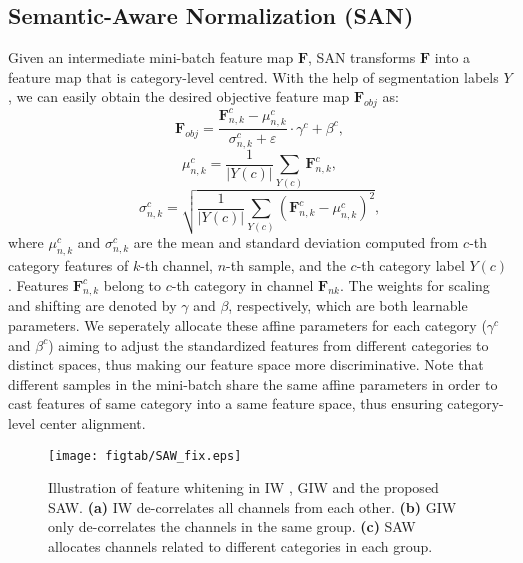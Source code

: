 \documentclass[10pt,twocolumn,letterpaper]{article}
\begin{document}
\subsection{Semantic-Aware Normalization (SAN) \label{subsec:Spatial Feature Constraint (SFC)}}
Given an intermediate mini-batch feature map $\mathbf{F}$, SAN transforms $\mathbf{F}$ into a feature map that is category-level centred. With the help of segmentation labels $Y$, we can easily obtain the desired objective feature map $\mathbf{F}_{obj}$ as:
\vspace{-2mm}
\begin{equation}
\mathbf{F}_{obj}=\frac{\mathbf{F}_{n,k}^{c}-\mu_{n,k}^{c}}{\sigma_{n,k}^{c}+\varepsilon}\cdot\gamma^{c}+\beta^{c},\label{eq:7}
\end{equation}
\begin{equation}
\mu_{n,k}^{c}=\frac{1}{|Y(c)|}\sum_{Y(c)}\mathbf{F}_{n,k}^{c},
\end{equation}
\begin{equation}
\sigma_{n,k}^{c}=\sqrt{\frac{1}{|Y(c)|}\sum_{Y(c)}(\mathbf{F}_{n,k}^{c}-\mu_{n,k}^{c})^{2}},
\end{equation}
\noindent where $\mu_{n,k}^{c}$ and $\sigma_{n,k}^{c}$ are the mean and standard deviation computed from $c$-th category features of $k$-th channel, $n$-th sample, and the $c$-th category label $Y(c)$. Features $\mathbf{F}_{n,k}^{c}$ belong to $c$-th category in channel $\mathbf{F}_{nk}$. The weights for scaling and shifting are denoted by $\gamma$ and $\beta$, respectively, which are both learnable parameters. We seperately allocate these affine parameters for each category (\ie $\gamma^{c}$ and $\beta^{c}$) aiming to adjust the standardized features from different categories to distinct spaces, thus making our feature space more discriminative. Note that different samples in the mini-batch share the same affine parameters in order to cast features of same category into a same feature space, thus ensuring category-level center alignment.



\begin{figure*}[t]
    \centering{}\vspace{-2mm}
     \texttt{[image: figtab/SAW\_fix.eps]} 
     \caption{Illustration of feature whitening in IW \cite{li2017universal}, GIW \cite{cho2019image} and the proposed SAW. \textbf{(a)} IW de-correlates all channels from each other. \textbf{(b)} GIW only de-correlates the channels in the same group. \textbf{(c)} SAW allocates channels related to different categories in each group.
     }
    \label{fig4}\vspace{-4mm}
    
    \end{figure*}
\end{document}
